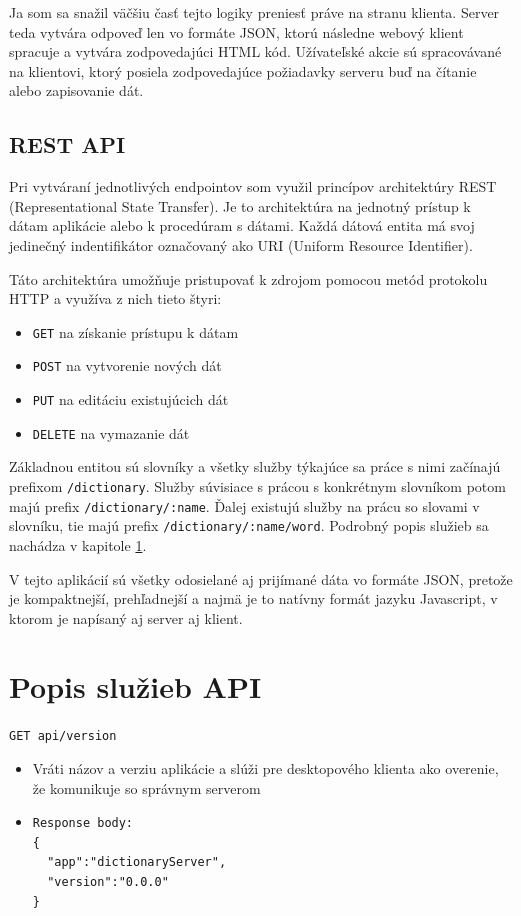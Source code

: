 \documentclass[
  digital, %
  table,   %
  lof,     %
  lot,     %
]{fithesis3}
\begin{document}
Ja som sa snažil väčšiu časť tejto logiky preniesť práve na stranu klienta. Server teda vytvára odpoveď len vo formáte JSON, ktorú následne webový klient spracuje a vytvára zodpovedajúci HTML kód. Užívateľské akcie sú spracovávané na klientovi, ktorý posiela zodpovedajúce požiadavky serveru buď na čítanie alebo zapisovanie dát.

\subsection{REST API}
Pri vytváraní jednotlivých endpointov som využil princípov architektúry REST (Representational State Transfer). Je to architektúra na jednotný prístup k dátam aplikácie alebo k procedúram s dátami. Každá dátová entita má svoj jedinečný indentifikátor označovaný ako URI (Uniform Resource Identifier).

Táto architektúra umožňuje pristupovať k zdrojom pomocou metód protokolu HTTP a využíva z nich tieto štyri:
\begin{itemize}
	\item \texttt{GET} na získanie prístupu k dátam
	\item \texttt{POST} na vytvorenie nových dát
	\item \texttt{PUT} na editáciu existujúcich dát
    \item \texttt{DELETE} na vymazanie dát
\end{itemize}

Základnou entitou sú slovníky a všetky služby týkajúce sa práce s nimi začínajú prefixom \texttt{/dictionary}. Služby súvisiace s prácou s konkrétnym slovníkom potom majú prefix \texttt{/dictionary/:name}. Ďalej existujú služby na prácu so slovami v slovníku, tie majú prefix \texttt{/dictionary/:name/word}. Podrobný popis služieb sa nachádza v kapitole \ref{sec:api}.

V tejto aplikácií sú všetky odosielané aj prijímané dáta vo formáte JSON, pretože je kompaktnejší, prehľadnejší a najmä je to natívny formát jazyku Javascript, v ktorom je napísaný aj server aj klient.


\section{Popis služieb API} \label{sec:api}

\texttt{GET api/version}
\begin{itemize}
\item Vráti názov a verziu aplikácie a slúži pre desktopového klienta ako overenie, že komunikuje so správnym serverom
\item \begin{lstlisting}[basicstyle=\small]
Response body:
{
  "app":"dictionaryServer",
  "version":"0.0.0"
}
\end{lstlisting}
\end{itemize}
\end{document}
